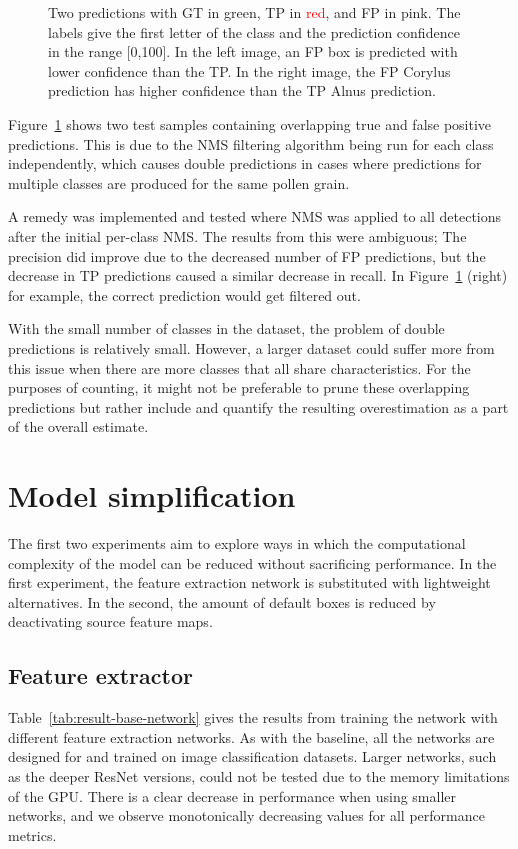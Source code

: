 \begin{figure}[htbp]
\begin{subfigure}[t]{0.4\textwidth}
  \end{subfigure}
  \caption[Predictions showing TP overlapped by FP from different class]{Two predictions with GT in \textcolor{nicegreen}{green}, TP in \textcolor{red}{red}, and FP in \textcolor{nicepink}{pink}.
The labels give the first letter of the class and the prediction confidence in the range [0,100].
In the left image, an FP box is predicted with lower confidence than the TP\@.
In the right image, the FP Corylus prediction has higher confidence than the TP Alnus prediction.}\label{fig:results-overlapping-predictions}
\end{figure}

Figure~\ref{fig:results-overlapping-predictions} shows two test samples containing overlapping true and false positive predictions.
This is due to the NMS filtering algorithm being run for each class independently, which causes double predictions in cases where predictions for multiple classes are produced for the same pollen grain.

A remedy was implemented and tested where NMS was applied to all detections after the initial per-class NMS\@.
The results from this were ambiguous; The precision did improve due to the decreased number of FP predictions, but the decrease in TP predictions caused a similar decrease in recall.
In Figure~\ref{fig:results-overlapping-predictions} (right) for example, the correct prediction would get filtered out.

With the small number of classes in the dataset, the problem of double predictions is relatively small.
However, a larger dataset could suffer more from this issue when there are more classes that all share characteristics.
For the purposes of counting, it might not be preferable to prune these overlapping predictions but rather include and quantify the resulting overestimation as a part of the overall estimate.

\section{Model simplification}\label{sec:results-simplification}
The first two experiments aim to explore ways in which the computational complexity of the model can be reduced without sacrificing performance.
In the first experiment, the feature extraction network is substituted with lightweight alternatives.
In the second, the amount of default boxes is reduced by deactivating source feature maps.

\subsection{Feature extractor}
Table~\ref{tab:result-base-network} gives the results from training the network with different feature extraction networks.
As with the baseline, all the networks are designed for and trained on image classification datasets.
Larger networks, such as the deeper ResNet versions, could not be tested due to the memory limitations of the GPU\@.
There is a clear decrease in performance when using smaller networks, and we observe monotonically decreasing values for all performance metrics.

